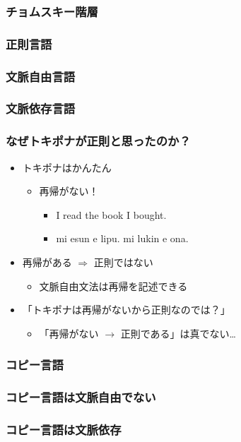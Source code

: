\documentclass[14pt]{beamer}
\theoremstyle{definition}
\begin{document}
\begin{frame}
	\frametitle{チョムスキー階層}
\end{frame}


\begin{frame}
	\frametitle{正則言語}
\end{frame}


\begin{frame}
	\frametitle{文脈自由言語}
\end{frame}


\begin{frame}
	\frametitle{文脈依存言語}
\end{frame}


\begin{frame}
	\frametitle{なぜトキポナが正則と思ったのか？}

	\begin{itemize}
		\item トキポナはかんたん
			\begin{itemize}
				\item 再帰がない！
					\begin{itemize}
						\item I read the book I bought.
						\item mi esun e lipu. mi lukin e ona.
					\end{itemize}
			\end{itemize}
		\item 再帰がある $\Rightarrow$ 正則ではない
			\begin{itemize}
				\item 文脈自由文法は再帰を記述できる
			\end{itemize}
		\item 「トキポナは再帰がないから正則なのでは？」
			\begin{itemize}
				\item {\color{gray} \small「再帰がない $\to$ 正則である」は真でない…}
			\end{itemize}
	\end{itemize}

\end{frame}


\begin{frame}
	\frametitle{コピー言語}
\end{frame}


\begin{frame}
	\frametitle{コピー言語は文脈自由でない}
\end{frame}


\begin{frame}
	\frametitle{コピー言語は文脈依存}
\end{frame}
\end{document}
